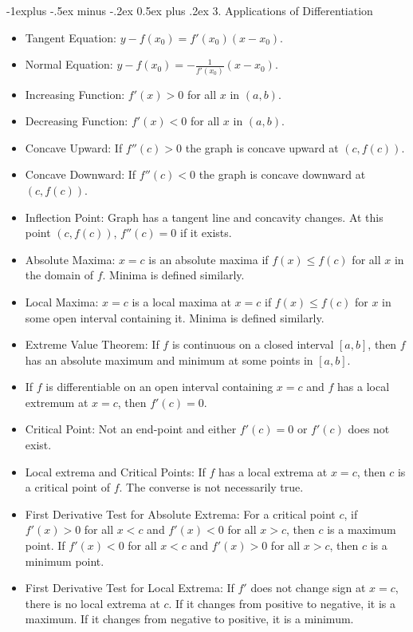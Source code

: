 \documentclass[10pt, portrait]{article}
\makeatletter
\renewcommand{\section}{\@startsection{section}{1}{0mm}%
                                {-1ex plus -.5ex minus -.2ex}%
                                {0.5ex plus .2ex}%
                                {\normalfont\large\bfseries}}
\renewcommand{\section}{\@startsection{section}{2}{0mm}%
                                {-1explus -.5ex minus -.2ex}%
                                {0.5ex plus .2ex}%
                                {\normalfont\normalsize\bfseries}}
\makeatother
\begin{document}
\begin{multicols*}{2}
\section{3. Applications of Differentiation}
\begin{itemize}
    \item Tangent Equation: $y-f(x_0)=f'(x_0)(x-x_0)$.
    \item Normal Equation: $y-f(x_0)=-\frac{1}{f'(x_0)}(x-x_0)$.
    \item Increasing Function: $f'(x) > 0$ for all $x$ in $(a, b)$.
    \item Decreasing Function: $f'(x) < 0$ for all $x$ in $(a, b)$.
    \item Concave Upward: If $f''(c) > 0$ the graph is concave upward at $(c, f(c))$.
    \item Concave Downward: If $f''(c) < 0$ the graph is concave downward at $(c, f(c))$.
    \item Inflection Point: Graph has a tangent line and concavity changes. At this point $(c, f(c))$, $f''(c)=0$ if it exists.
    \item Absolute Maxima: $x=c$ is an absolute maxima if $f(x) \leq f(c)$ for all $x$ in the domain of $f$. Minima is defined similarly.
    \item Local Maxima: $x=c$ is a local maxima at $x=c$ if $f(x)\leq f(c)$ for $x$ in some open interval containing it. Minima is defined similarly.
    \item Extreme Value Theorem: If $f$ is continuous on a closed interval $[a,b]$, then $f$ has an absolute maximum and minimum at some points in $[a,b]$.
    \item If $f$ is differentiable on an open interval containing $x=c$ and $f$ has a local extremum at $x=c$, then $f'(c)=0$.
    \item Critical Point: Not an end-point and either $f'(c)=0$ or $f'(c)$ does not exist.
    \item Local extrema and Critical Points: If $f$ has a local extrema at $x=c$, then $c$ is a critical point of $f$. The converse is not necessarily true.
    \item First Derivative Test for Absolute Extrema: For a critical point $c$, if $f'(x)>0$ for all $x < c$ and $f'(x) <0$ for all $x > c$, then $c$ is a maximum point. If $f'(x)<0$ for all $x < c$ and $f'(x) > 0$ for all $x > c$, then $c$ is a minimum point.
    \item First Derivative Test for Local Extrema: If $f'$ does not change sign at $x=c$, there is no local extrema at $c$. If it changes from positive to negative, it is a maximum. If it changes from negative to positive, it is a minimum.

\end{itemize}
\end{multicols*}
\end{document}

